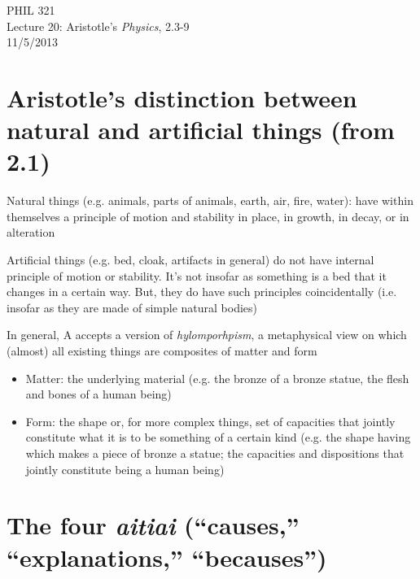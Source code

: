 \documentclass[11pt]{article}
\begin{document}
\thispagestyle{empty}
\begin{center} \LARGE{PHIL 321\\ Lecture 20: Aristotle's \emph{Physics}, 2.3-9}\\ \vspace*{2mm}
\large{11/5/2013}\end{center}
\thispagestyle{empty}\vspace*{3mm}
\vspace*{-8mm}

\section*{Aristotle's distinction between natural and artificial things (from 2.1)}

\noindent Natural things (e.g. animals, parts of animals, earth, air, fire, water): have within themselves a principle of motion and stability in place, in growth, in decay, or in alteration
\vspace*{2mm}

\noindent Artificial things (e.g. bed, cloak, artifacts in general) do not have internal principle of motion or stability. It's not insofar as something is a bed that it changes in a certain way. But, they do have such principles coincidentally (i.e. insofar as they are made of simple natural bodies)
\vspace*{2mm}

\noindent In general, A accepts a version of \emph{hylomporhpism}, a metaphysical view on which (almost) all existing things are composites of matter and form
\begin{itemize}\item{Matter: the underlying material (e.g. the bronze of a bronze statue, the flesh and bones of a human being)}\item{Form: the shape or, for more complex things, set of capacities that jointly constitute what it is to be something of a certain kind (e.g. the shape having which makes a piece of bronze a statue; the capacities and dispositions that jointly constitute being a human being)}\end{itemize}

\section*{The four \emph{aitiai} (``causes,'' ``explanations,'' ``becauses'')}
\end{document}
